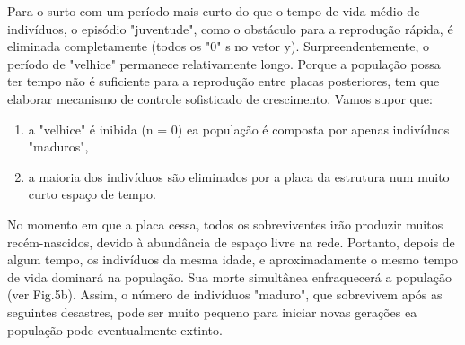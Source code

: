 \documentclass{article}
\begin{document}
Para o surto com um período mais curto do que o tempo de vida médio de indivíduos, o episódio "juventude", como o obstáculo para a reprodução rápida, é eliminada completamente (todos os "0" s no vetor y). Surpreendentemente, o período de "velhice" permanece relativamente longo. Porque a população possa ter tempo não é suficiente para a reprodução entre placas posteriores, tem que elaborar mecanismo de controle sofisticado de crescimento. Vamos supor que:

\begin{enumerate}


\item a "velhice" é inibida (n = 0) ea população é composta por apenas indivíduos "maduros",


\item a maioria dos indivíduos são eliminados por a placa da estrutura num muito curto espaço de tempo.

\end{enumerate}


No momento em que a placa cessa, todos os sobreviventes irão produzir muitos recém-nascidos, devido à abundância de espaço livre na rede. Portanto, depois de algum tempo, os indivíduos da mesma idade, e aproximadamente o mesmo tempo de vida dominará na população. Sua morte simultânea enfraquecerá a população (ver Fig.5b). Assim, o número de indivíduos "maduro", que sobrevivem após as seguintes desastres, pode ser muito pequeno para iniciar novas gerações ea população pode eventualmente extinto.
\end{document}
